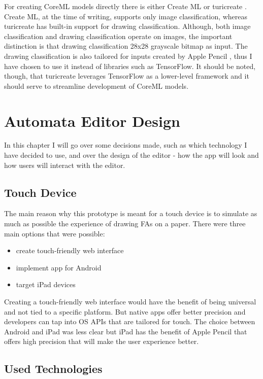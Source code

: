 For creating CoreML models directly there is either Create ML \cite{create-ml} or turicreate \cite{turicreate}. Create ML, at the time of writing, supports only image classification, whereas turicreate has built-in support for drawing classification. Although, both image classification and drawing classification operate on images, the important distinction is that drawing classification 28x28 grayscale bitmap as input. The drawing classification is also tailored for inputs created by Apple Pencil \cite{drawing-classification}, thus I have chosen to use it instead of libraries such as TensorFlow. It should be noted, though, that turicreate leverages TensorFlow as a lower-level framework and it should serve to streamline development of CoreML models.

\chapter{Automata Editor Design}
\label{chap:design}

In this chapter I will go over some decisions made, such as which technology I have decided to use, and over the design of the editor - how the app will look and how users will interact with the editor.

\section{Touch Device}
The main reason why this prototype is meant for a touch device is to simulate as much as possible the experience of drawing FAs on a paper. There were three main options that were possible:
\begin{itemize}
    \item create touch-friendly web interface
    \item implement app for Android
    \item target iPad devices
\end{itemize}
Creating a touch-friendly web interface would have the benefit of being universal and not tied to a specific platform. But native apps offer better precision and developers can tap into OS APIs that are tailored for touch. The choice between Android and iPad was less clear but iPad has the benefit of Apple Pencil \cite{apple-pencil} that offers high precision that will make the user experience better.

\section{Used Technologies}

